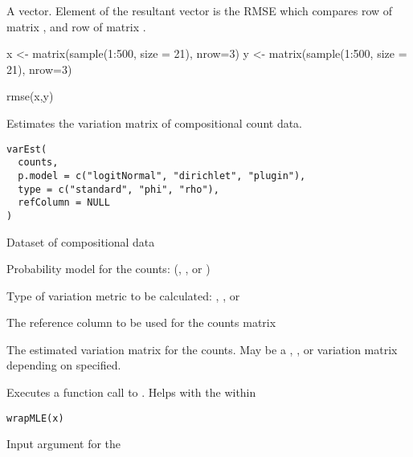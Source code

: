 \documentclass[a4paper]{book}
\begin{document}
%
\begin{Value}
A vector. Element  of the resultant vector is the RMSE which 
compares row  of matrix , and row  of matrix .
\end{Value}
%
\begin{Examples}
\begin{ExampleCode}
x <- matrix(sample(1:500, size = 21), nrow=3)
y <- matrix(sample(1:500, size = 21), nrow=3)

rmse(x,y)

\end{ExampleCode}
\end{Examples}
%
\begin{Description}\relax
Estimates the variation matrix of compositional count data.
\end{Description}
%
\begin{Usage}
\begin{verbatim}
varEst(
  counts,
  p.model = c("logitNormal", "dirichlet", "plugin"),
  type = c("standard", "phi", "rho"),
  refColumn = NULL
)
\end{verbatim}
\end{Usage}
%
\begin{Arguments}
\begin{ldescription}
\item[\code{counts}] Dataset of compositional data

\item[\code{p.model}] Probability model for the counts: (, ,
or )

\item[\code{type}] Type of variation metric to be calculated: , 
, or 

\item[\code{refColumn}] The reference column to be used for the counts matrix
\end{ldescription}
\end{Arguments}
%
\begin{Value}
The estimated variation matrix for the counts. May be a ,
, or  variation matrix depending on  specified.
\end{Value}
%
\begin{Description}\relax
Executes a function call to . Helps with the  
within 
\end{Description}
%
\begin{Usage}
\begin{verbatim}
wrapMLE(x)
\end{verbatim}
\end{Usage}
%
\begin{Arguments}
\begin{ldescription}
\item[\code{x}] Input argument for the 
\end{ldescription}
\end{Arguments}
\printindex{}
\end{document}
